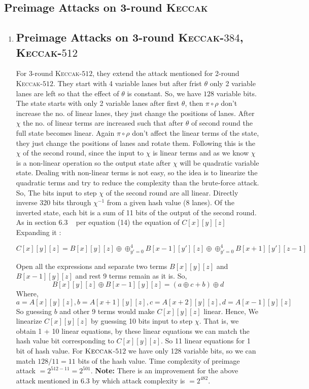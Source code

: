 \documentclass[runningheads]{llncs}
\newcommand{\KECCAK}{\mbox{\textsc{Keccak}}}
\begin{document}
\subsection{Preimage Attacks on 3-round \KECCAK}
\begin{enumerate}
	\item \subsection{Preimage Attacks on 3-round \KECCAK-$384$, \KECCAK-$512$}
		For 3-round \KECCAK-$512$, they extend the attack mentioned for 2-round \KECCAK-$512$. They start with 4 variable lanes but after frist $\theta$ only 2 variable lanes are left so that the effect of $\theta$ is constant. So, we have $128$ variable bits. The state starts with only 2 variable lanes after first $\theta$, then $\pi \circ \rho$ don't increase the no. of linear lanes, they just change the positions of lanes. After $\chi$ the no. of linear terms are increased such that after $\theta$ of second round the full state becomes linear. Again $\pi \circ \rho$ don't affect the linear terms of the state, they just change the positions of lanes and rotate them. Following this is the $\chi$ of the second round, since the input to $\chi$ is linear terms and as we know $\chi$ is a non-linear operation so the output state after $\chi$ will be quadratic variable state. Dealing with non-linear terms is not easy, so the idea is to linearize the quadratic terms and try to reduce the complexity than the brute-force attack.
		So, The bits input to step $\chi$ of the second round are all linear. Directly inverse 320 bits through $\chi^{-1}$ from a given hash value (8 lanes). Of the inverted state, each bit is a sum of 11 bits of the output of the second round. 
    As in section 6.3 ~\cite{guo2016linear} per equation (14) the equation of $C[x][y][z]$
    Expanding it :

    \[
        C[x][y][z] = B[x][y][z] \oplus \oplus_{y' = 0}^{4} B[x-1][y'][z] \oplus \oplus_{y' = 0}^{4} B[x+1][y'][z-1]
    \]
    
		Open all the expressions and separate two terms $B[x][y][z]$ and $B[x-1][y][z]$ and rest 9 terms remain as it is.
    So, 
		\[ B[x][y][z] \oplus B[x-1][y][z] = (a \oplus c + b) \oplus d
    \]
    Where,
		 \[
        a = A[x][y][z], b = A[x + 1][y][z], c = A[x + 2][y][z], d = A[x - 1][y][z]
    \]
    So guessing $b$ and other 9 terms would make $C[x][y][z]$ linear. Hence, We linearize $C[x][y][z]$ by guessing 10 bits input to step $\chi$. That is, we obtain 1 + 10 linear equations, by these linear equations we can match the hash value bit corresponding to $C[x][y][z]$. So 11 linear equations for 1 bit of hash value. For $\KECCAK$-$512$ we have only 128 variable bits, so we can match $128/11 = 11$ bits of the hash value.
    Time complexity of preimage attack $= 2^{512 - 11} = 2^{501}$.
    \textbf{Note:} There is an improvement for the above attack mentioned in 6.3 by which attack complexity is $= 2^{482}$.


\end{enumerate}
\end{document}
